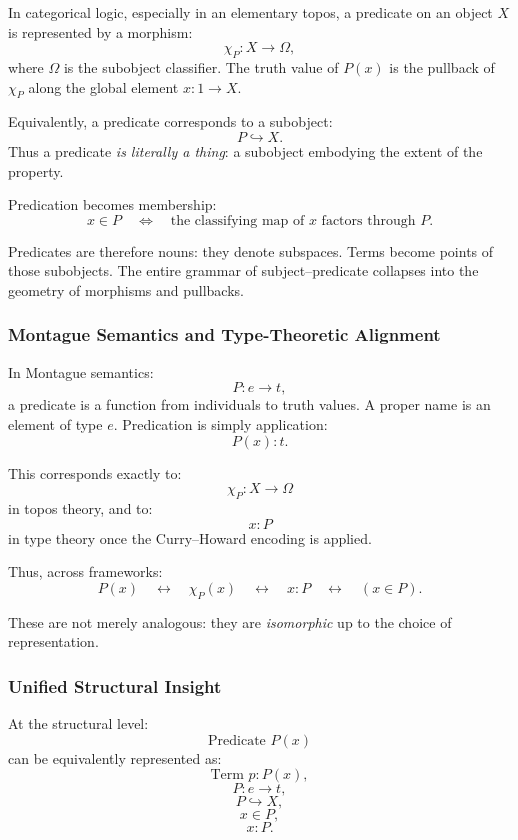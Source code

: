\documentclass[12pt,letterpaper]{article}
\begin{document}
In categorical logic, especially in an elementary topos, a predicate on an
object $X$ is represented by a morphism:
\[
\chi_P : X \to \Omega,
\]
where $\Omega$ is the subobject classifier.  The truth value of $P(x)$ is the
pullback of $\chi_P$ along the global element $x : 1 \to X$.

Equivalently, a predicate corresponds to a subobject:
\[
P \hookrightarrow X.
\]
Thus a predicate \emph{is literally a thing}: a subobject embodying the extent
of the property.

Predication becomes membership:
\[
x \in P \quad\Longleftrightarrow\quad \text{the classifying map of } x \text{ factors through } P.
\]

Predicates are therefore nouns: they denote subspaces.  Terms become points of
those subobjects.  The entire grammar of subject–predicate collapses into the
geometry of morphisms and pullbacks.

\subsubsection*{Montague Semantics and Type-Theoretic Alignment}

In Montague semantics:
\[
P : e \to t,
\]
a predicate is a function from individuals to truth values.  A proper name is an
element of type $e$.  Predication is simply application:
\[
P(x) : t.
\]

This corresponds exactly to:
\[
\chi_P : X \to \Omega
\]
in topos theory, and to:
\[
x : P
\]
in type theory once the Curry--Howard encoding is applied.

Thus, across frameworks:
\[
P(x)
\quad\longleftrightarrow\quad
\chi_P(x)
\quad\longleftrightarrow\quad
x : P
\quad\longleftrightarrow\quad
(x \in P).
\]

These are not merely analogous: they are \emph{isomorphic} up to the choice of
representation.

\subsubsection*{Unified Structural Insight}

At the structural level:
\[
\text{Predicate } P(x)
\]
can be equivalently represented as:
\[
\text{Term } p : P(x),
\]
\[
P : e \to t,
\]
\[
P \hookrightarrow X,
\]
\[
x \in P,
\]
\[
x : P.
\]
\end{document}
